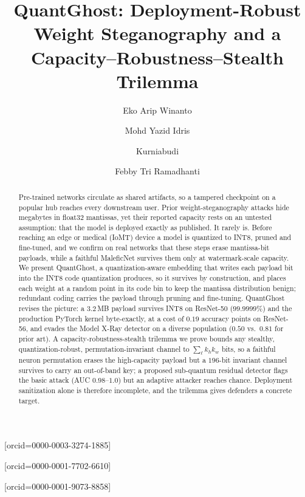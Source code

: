 \documentclass[a4paper,fleqn]{cas-dc}
\theoremstyle{plain}
\theoremstyle{remark}
\newcommand{\sys}{\mbox{QuantGhost}}
\begin{document}

\title[mode=title]{\sys: Deployment-Robust Weight Steganography and a Capacity--Robustness--Stealth Trilemma}

\author[1,2]{Eko Arip Winanto}[orcid=0000-0003-3274-1885]
\author[1,3]{Mohd Yazid Idris}[orcid=0000-0001-7702-6610]
\author[4]{Kurniabudi}[orcid=0000-0001-9073-8858]
\cormark[1]
\author[5]{Febby Tri Ramadhanti}


\begin{abstract}
Pre-trained networks circulate as shared artifacts, so a tampered checkpoint on a popular
hub reaches every downstream user. Prior weight-steganography attacks hide megabytes in
float32 mantissas, yet their reported capacity rests on an untested assumption: that the
model is deployed exactly as published. It rarely is. Before reaching an edge or medical
(IoMT) device a model is quantized to INT8, pruned and fine-tuned, and we confirm on real
networks that these steps erase mantissa-bit payloads, while a faithful MaleficNet
survives them only at watermark-scale capacity. We present \sys, a quantization-aware
embedding that writes each payload bit into the INT8 code quantization produces, so it
survives by construction, and places each weight at a random point in its code bin to keep
the mantissa distribution benign; redundant coding carries the payload through pruning and
fine-tuning. \sys{} revises the picture: a $3.2$\,MB payload survives INT8 on ResNet-50
($99.9999\%$) and the production PyTorch kernel byte-exactly, at a cost of $0.19$ accuracy
points on ResNet-56, and evades the Model X-Ray detector on a diverse population
($0.50$ vs.\ $0.81$ for prior art). A capacity-robustness-stealth trilemma we prove bounds
any stealthy, quantization-robust, permutation-invariant channel to
$\sum_\ell k_h k_w$ bits, so a faithful neuron permutation erases the high-capacity payload
but a $196$-bit invariant channel survives to carry an out-of-band key; a proposed
sub-quantum residual detector flags the basic attack (AUC $0.98$--$1.0$) but an adaptive
attacker reaches chance. Deployment sanitization alone is therefore incomplete, and the
trilemma gives defenders a concrete target.
\end{abstract}
\end{document}
